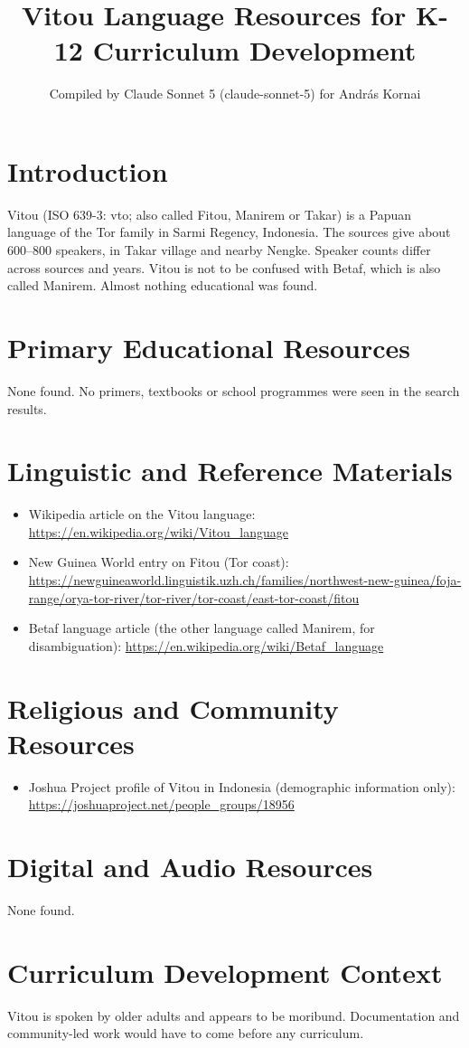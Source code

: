 \documentclass[12pt]{article}
\title{Vitou Language Resources for K-12 Curriculum Development}
\author{Compiled by Claude Sonnet 5 (claude-sonnet-5) for Andr\'as Kornai}
\date{}
\begin{document}
\maketitle

\section{Introduction}
Vitou (ISO 639-3: vto; also called Fitou, Manirem or Takar) is a Papuan language of the Tor family in Sarmi Regency, Indonesia. The sources give about 600--800 speakers, in Takar village and nearby Nengke. Speaker counts differ across sources and years. Vitou is not to be confused with Betaf, which is also called Manirem. Almost nothing educational was found.

\section{Primary Educational Resources}
None found. No primers, textbooks or school programmes were seen in the search results.

\section{Linguistic and Reference Materials}
\begin{itemize}
\item Wikipedia article on the Vitou language: \url{https://en.wikipedia.org/wiki/Vitou_language}
\item New Guinea World entry on Fitou (Tor coast): \url{https://newguineaworld.linguistik.uzh.ch/families/northwest-new-guinea/foja-range/orya-tor-river/tor-river/tor-coast/east-tor-coast/fitou}
\item Betaf language article (the other language called Manirem, for disambiguation): \url{https://en.wikipedia.org/wiki/Betaf_language}
\end{itemize}

\section{Religious and Community Resources}
\begin{itemize}
\item Joshua Project profile of Vitou in Indonesia (demographic information only): \url{https://joshuaproject.net/people_groups/18956}
\end{itemize}

\section{Digital and Audio Resources}
None found.

\section{Curriculum Development Context}
Vitou is spoken by older adults and appears to be moribund. Documentation and community-led work would have to come before any curriculum.
\end{document}
